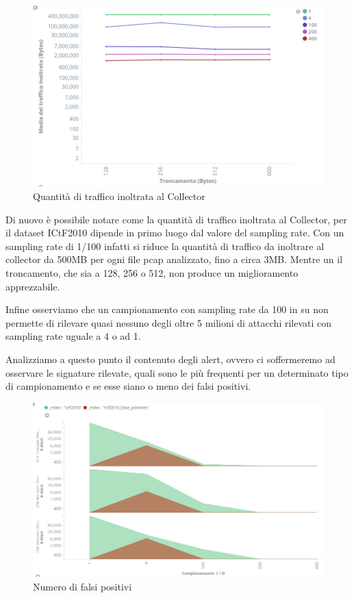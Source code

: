 \documentclass[12pt,a4paper,openright,twoside]{report}
\begin{document}
\begin{figure}[h!]
\begin{center}                          %
  \includegraphics[width=\textwidth]{images/ICTF-trunc-vs-traffic.png}
  \caption{Quantit\`a di traffico inoltrata al Collector}
  \label{}
\end{center}
\end{figure}

Di nuovo \`e possibile notare come la quantit\`a di traffico inoltrata al Collector,
per il dataset ICtF2010 dipende in primo luogo dal valore del sampling rate.
Con un sampling rate di 1/100 infatti si riduce la quantit\`a di traffico da inoltrare al
collector da 500MB per ogni file pcap analizzato, fino a circa 3MB.
Mentre un il troncamento, che sia a 128, 256 o 512, non produce un miglioramento apprezzabile.

Infine osserviamo che  un campionamento con sampling rate da 100 in su non permette
di rilevare quasi nessuno degli oltre 5 milioni di attacchi rilevati con
sampling rate uguale a 4 o ad 1.

Analizziamo a questo punto il contenuto degli alert, ovvero ci soffermeremo ad osservare le signature
rilevate, quali sono le pi\`u frequenti per un determinato tipo di campionamento e
se esse siano o meno dei falsi positivi.

\begin{figure}[h!]
\begin{center}                          %
  \includegraphics[width=\textwidth]{images/ICTF-false-positives-mul.png}
  \caption{Numero di falsi positivi}
  \label{}
\end{center}
\end{figure}
\end{document}
